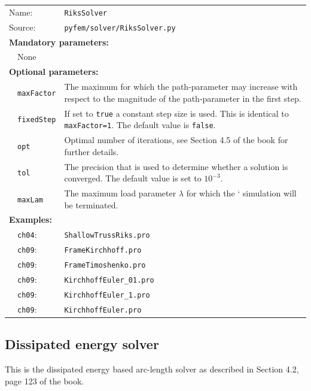 \documentclass{article}
\begin{document}
\vspace{2mm}
\begin{tabular}{p{22mm}p{74mm}}
Name:    & \texttt{RiksSolver} \\
Source:  & \texttt{pyfem/solver/RiksSolver.py} \\
\multicolumn{2}{l}{\textbf{Mandatory parameters:}} \\
~~None & \\
\multicolumn{2}{l}{\textbf{Optional parameters:}} \\ 
~~\texttt{maxFactor} & The maximum for which the path-parameter
                       may increase with respect to the magnitude of the path-parameter
                       in the first step.\\
~~\texttt{fixedStep} & If set to \texttt{true} a constant step size is used. This is identical to
                       \texttt{maxFactor=1}. The default value is \texttt{false}.\\
~~\texttt{opt}       & Optimal number of iterations, see Section 4.5 of the book for further details.\\
~~\texttt{tol}       & The precision that is used to determine whether a solution is converged. The 
                       default value is set to $10^{-3}$.\\
~~\texttt{maxLam}    & The maximum load parameter $\lambda$ for which the
                      ` simulation will be terminated.\\
\multicolumn{2}{l}{\textbf{Examples:}}\\
~~\texttt{ch04}: & \texttt{ShallowTrussRiks.pro}\\
~~\texttt{ch09}: & \texttt{FrameKirchhoff.pro}\\
~~\texttt{ch09}: & \texttt{FrameTimoshenko.pro}\\
~~\texttt{ch09}: & \texttt{KirchhoffEuler\_01.pro}\\
~~\texttt{ch09}: & \texttt{KirchhoffEuler\_1.pro}\\
~~\texttt{ch09}: & \texttt{KirchhoffEuler.pro}
\end{tabular}

\subsection{Dissipated energy solver}

This is the dissipated energy based arc-length solver as described in Section 4.2, page 123 of the book.
\end{document}
